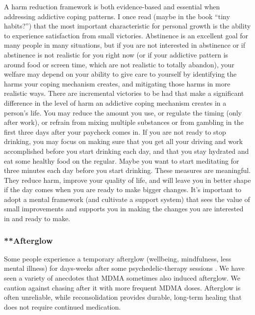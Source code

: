 \documentclass[12pt,letterpaper]{article}
\begin{document}
A harm reduction framework is both evidence-based and essential when addressing addictive coping patterns. I once read (maybe in the book “tiny habits?”) that the most important characteristic for personal growth is the ability to experience satisfaction from small victories. Abstinence is an excellent goal for many people in many situations, but if you are not interested in abstinence or if abstinence is not realistic for you right now (or if your addictive pattern is around food or screen time, which are not realistic to totally abandon), your welfare may depend on your ability to give care to yourself by identifying the harms your coping mechanism creates, and mitigating those harms in more realistic ways. There are incremental victories to be had that make a significant difference in the level of harm an addictive coping mechanism creates in a person's life. You may reduce the amount you use, or regulate the timing (only after work), or refrain from mixing multiple substances or from gambling in the first three days after your paycheck comes in. If you are not ready to stop drinking, you may focus on making sure that you get all your driving and work accomplished before you start drinking each day, and that you stay hydrated and eat some healthy food on the regular. Maybe you want to start meditating for three minutes each day before you start drinking. These measures are meaningful. They reduce harm, improve your quality of life, and will leave you in better shape if the day comes when you are ready to make bigger changes. It's important to adopt a mental framework (and cultivate a support system) that sees the value of small improvements and supports you in making the changes you are interested in and ready to make.
\subsubsection{**Afterglow}
Some people experience a temporary afterglow (wellbeing, mindfulness, less mental illness) for days-weeks after some psychedelic-therapy sessions \cite{evansAfterglow}. We have seen a variety of anecdotes that MDMA sometimes also induced afterglow. We caution against chasing after it with more frequent MDMA doses. Afterglow is often unreliable, while reconsolidation provides durable, long-term healing that does not require continued medication.
\FloatBarrier
\end{document}
